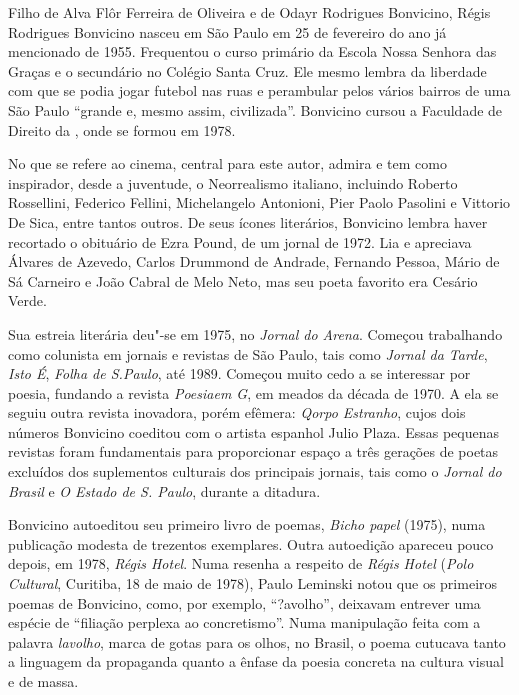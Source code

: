 Filho de Alva Flôr Ferreira de Oliveira e de Odayr Rodrigues Bonvicino,
Régis Rodrigues Bonvicino nasceu em São Paulo em 25 de fevereiro do ano
já mencionado de 1955. Frequentou o curso primário da Escola Nossa
Senhora das Graças e o secundário no Colégio Santa Cruz. Ele mesmo
lembra da liberdade com que se podia jogar futebol nas ruas e perambular
pelos vários bairros de uma São Paulo ``grande e, mesmo assim,
civilizada''. Bonvicino cursou a Faculdade de Direito da , onde se
formou em 1978.

No que se refere ao cinema, central para este autor, admira e tem como
inspirador, desde a juventude, o Neorrealismo italiano, incluindo
Roberto Rossellini, Federico Fellini, Michelangelo Antonioni, Pier Paolo
Pasolini e Vittorio De Sica, entre tantos outros. De seus ícones
literários, Bonvicino lembra haver recortado o obituário de Ezra Pound,
de um jornal de 1972. Lia e apreciava Álvares de Azevedo, Carlos
Drummond de Andrade, Fernando Pessoa, Mário de Sá Carneiro e João Cabral
de Melo Neto, mas seu poeta favorito era Cesário Verde.

Sua estreia literária deu"-se em 1975, no \emph{Jornal do Arena}. Começou
trabalhando como colunista em jornais e revistas de São Paulo, tais como
\emph{Jornal da Tarde}, \emph{Isto É}, \emph{Folha de S.Paulo}, até
1989. Começou muito cedo a se interessar por poesia, fundando a revista
\emph{Poesiaem G}, em meados da década de 1970. A ela se seguiu outra
revista inovadora, porém efêmera: \emph{Qorpo Estranho}, cujos dois
números Bonvicino coeditou com o artista espanhol Julio Plaza. Essas
pequenas revistas foram fundamentais para proporcionar espaço a três
gerações de poetas excluídos dos suplementos culturais dos principais
jornais, tais como o \emph{Jornal do Brasil} e \emph{O Estado de S.
Paulo}, durante a ditadura.

Bonvicino autoeditou seu primeiro livro de poemas, \emph{Bicho papel}
(1975), numa publicação modesta de trezentos exemplares. Outra
autoedição apareceu pouco depois, em 1978, \emph{Régis Hotel}. Numa
resenha a respeito de \emph{Régis Hotel} (\emph{Polo Cultural},
Curitiba, 18 de maio de 1978), Paulo Leminski notou que os primeiros
poemas de Bonvicino, como, por exemplo, ``?avolho'', deixavam entrever
uma espécie de ``filiação perplexa ao concretismo''. Numa manipulação
feita com a palavra \emph{lavolho}, marca de gotas para os olhos, no
Brasil, o poema cutucava tanto a linguagem da propaganda quanto a ênfase
da poesia concreta na cultura visual e de massa.

